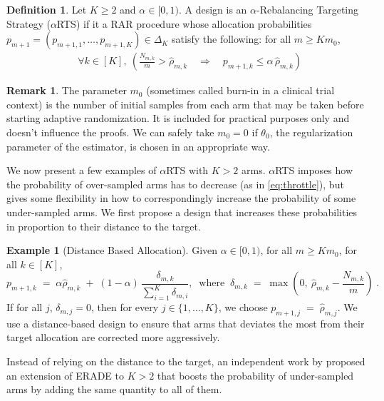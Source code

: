 \documentclass[11pt]{article}
\theoremstyle{plain}
\theoremstyle{definition}
\newtheorem{definition}{Definition}[section]
\newtheorem{example}{Example}[section]
\newtheorem{remark}[theorem]{Remark}
\begin{document}
\begin{definition} Let $K\geq 2$ and $\alpha\in[0,1)$. A design is an $\alpha$-Rebalancing Targeting Strategy ($\alpha$RTS) if it a RAR procedure whose allocation probabilities $p_{m+1}=(p_{m+1,1},\dots,p_{m+1,K}) \in \Delta_K$ satisfy the following: for all $m \geq Km_0$,
	\begin{align}
		&\forall k \in [K], \  \left(\frac{N_{m,k}}{m}>\hat\rho_{m,k}\quad \Longrightarrow\quad p_{m+1,k}\le \alpha\,\hat\rho_{m,k}\right) \label{eq:throttle}
	\end{align}
\end{definition}
\begin{remark}
	The parameter $m_0$ (sometimes called burn-in in a clinical trial context) is the number of initial samples from each arm that may be taken before starting adaptive randomization. It is included for practical purposes only and doesn't influence the proofs. We can safely take $m_0 = 0$ if $\theta_0$, the regularization parameter of the estimator, is chosen in an appropriate way.
\end{remark}
We now present a few examples of $\alpha$RTS with $K > 2$ arms. $\alpha$RTS imposes how the probability of over-sampled arms has to decrease (as in \eqref{eq:throttle}), but gives some flexibility in how to correspondingly increase the probability of some under-sampled arms. We first propose a design that increases these probabilities in proportion to their distance to the target.

\begin{example}[Distance Based Allocation]
	Given $\alpha \in [0,1)$, for all $m\geq Km_0$, for all $k \in [K]$,
	\begin{equation*}\label{eq:example}
		p_{m+1,k} \;=\; \alpha \hat{\rho}_{m,k} \;+\; (1-\alpha)\,
		\frac{\delta_{m,k}}{\sum_{i=1}^K \delta_{m,i}},
		\ \text{ where } \
		\delta_{m,k} \;=\; \max\!\left(0,\ \hat{\rho}_{m,k} - \frac{N_{m,k}}{m}\right)\;.
	\end{equation*}
	If for all $j$, $\delta_{m,j}=0$, then for every $j \in \{1,\ldots,K\}$, we choose \(p_{m+1,j} \;=\; \hat{\rho}_{m,j}.\) We use a distance-based design to ensure that arms that deviates the most from their target allocation are corrected more aggressively.
\end{example}


\smallskip

Instead of relying on the distance to the target, an independent work by \citep{alkhnefr2025efficient} proposed an extension of ERADE to $K>2$ that boosts the probability of under-sampled arms by adding the same quantity to all of them.
\end{document}
